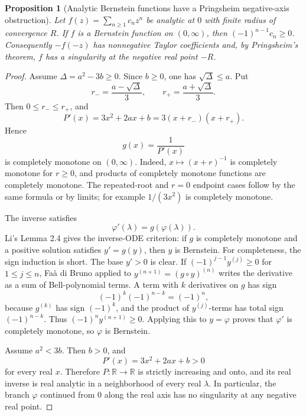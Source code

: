 \documentclass[11pt]{article}
\numberwithin{equation}{section}
\newtheorem{proposition}[theorem]{Proposition}
\theoremstyle{definition}
\theoremstyle{remark}
\newcommand{\1}{\mathbf 1}
\begin{document}
\begin{proposition}[Analytic Bernstein functions have a Pringsheim negative-axis obstruction]
\label{res:analyticbf-pringsheim-negativeaxisobstruction}
Let \(f(z)=\sum_{n\ge1}c_n z^n\) be analytic at \(0\) with finite radius of convergence \(R\). If \(f\) is a Bernstein function on \((0,\infty)\), then \((-1)^{n-1}c_n\ge0\). Consequently \(-f(-z)\) has nonnegative Taylor coefficients and, by Pringsheim's theorem, \(f\) has a singularity at the negative real point \(-R\).
\end{proposition}

\begin{proof}
Assume \(\Delta=a^2-3b\ge0\). Since \(b\ge0\), one has \(\sqrt{\Delta}\le a\). Put
\[
r_-=\frac{a-\sqrt{\Delta}}3,\qquad
r_+=\frac{a+\sqrt{\Delta}}3.
\]
Then \(0\le r_-\le r_+\), and
\[
P'(x)=3x^2+2ax+b=3(x+r_-)(x+r_+).
\]
Hence
\[
g(x)=\frac1{P'(x)}
\]
is completely monotone on \((0,\infty)\). Indeed, \(x\mapsto (x+r)^{-1}\) is completely monotone for \(r\ge0\), and products of completely monotone functions are completely monotone. The repeated-root and \(r=0\) endpoint cases follow by the same formula or by limits; for example \(1/(3x^2)\) is completely monotone.

The inverse satisfies
\[
\varphi'(\lambda)=g(\varphi(\lambda)).
\]
Li's Lemma 2.4 gives the inverse-ODE criterion: if \(g\) is completely monotone and a positive solution satisfies \(y'=g(y)\), then \(y\) is Bernstein. For completeness, the sign induction is short. The base \(y'>0\) is clear. If \((-1)^{j-1}y^{(j)}\ge0\) for \(1\le j\le n\), Faà di Bruno applied to \(y^{(n+1)}=(g\circ y)^{(n)}\) writes the derivative as a sum of Bell-polynomial terms. A term with \(k\) derivatives on \(g\) has sign
\[
(-1)^k(-1)^{n-k}=(-1)^n,
\]
because \(g^{(k)}\) has sign \((-1)^k\), and the product of \(y^{(j)}\)-terms has total sign \((-1)^{n-k}\). Thus \((-1)^n y^{(n+1)}\ge0\). Applying this to \(y=\varphi\) proves that \(\varphi'\) is completely monotone, so \(\varphi\) is Bernstein.

Assume \(a^2<3b\). Then \(b>0\), and
\[
P'(x)=3x^2+2ax+b>0
\]
for every real \(x\). Therefore \(P:\mathbb R\to\mathbb R\) is strictly increasing and onto, and its real inverse is real analytic in a neighborhood of every real \(\lambda\). In particular, the branch \(\varphi\) continued from \(0\) along the real axis has no singularity at any negative real point.


\end{proof}
\end{document}
